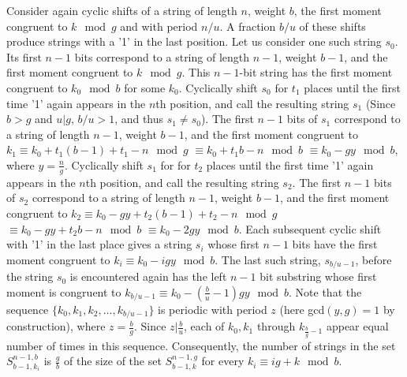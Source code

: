 \documentclass[12pt]{article} \pagestyle{plain} \topmargin
\begin{document}
Consider again cyclic shifts of a string of length $n$, weight $b$,
the first moment congruent to $k \mod g$ and with period $n/u$. A
fraction $b/u$ of these shifts produce strings with a '1' in the
last position. Let us consider one such string $s_0$. Its first
$n-1$ bits correspond to a string of length $n-1$, weight $b-1$, and
the first moment congruent to $k \mod g$. This $n-1$-bit string has
the first moment congruent to $k_0 \mod b$ for some $k_0$.
Cyclically shift $s_0$ for $t_1$ places until the first time '1'
again appears in the $n$th position, and call the resulting string
$s_1$ (Since $b>g$ and $u|g$, $b/u>1$, and thus $s_1 \neq s_0$). The
first $n-1$ bits of $s_1$ correspond to a string of length $n-1$,
weight $b-1$, and the first moment congruent to $k_1 \equiv
k_0+t_1(b-1)+t_1-n \mod g$ $\equiv k_0+t_1b-n \mod b$ $\equiv k_0-gy
\mod b$, where $y=\frac{n}{g}$. Cyclically shift $s_1$ for for $t_2$
places until the first time '1' again appears in the $n$th position,
and call the resulting string $s_2$. The first $n-1$ bits of $s_2$
correspond to a string of length $n-1$, weight $b-1$, and the first
moment congruent to $k_2 \equiv k_0-gy+t_2(b-1)+t_2-n \mod g$
$\equiv k_0-gy+t_2b-n \mod b$ $\equiv k_0-2gy \mod b$. Each
subsequent cyclic shift with  '1' in the last place gives a string
$s_i$ whose first $n-1$ bits have the first moment congruent to $k_i
\equiv k_0-igy \mod b$. The last such string, $s_{b/u-1}$, before
the string $s_0$ is encountered again has the left $n-1$ bit
substring whose first moment is congruent to $k_{b/u-1} \equiv
k_0-(\frac{b}{u}-1)gy \mod b$. Note that the sequence
$\{k_0,k_1,k_2,\dots,k_{b/u-1}\}$ is periodic with period $z$ (here
gcd$(y,g)=1$ by construction), where $z=\frac{b}{g}$. Since
$z|\frac{b}{u}$, each of $k_0,k_1$ through $k_{\frac{b}{g}-1}$
appear equal number of times in this sequence. Consequently, the
number of strings in the set $S_{b-1,k_i}^{n-1,b}$ is $\frac{g}{b}$
of the size of the set $S_{b-1,k}^{n-1,g}$ for every $k_i \equiv
ig+k \mod b$.


\end{document}
